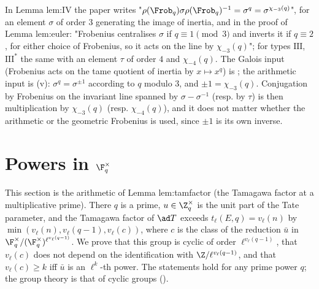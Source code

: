 \begin{paperlink}\label{pl:rings:euler}
In Lemma lem:IV the paper writes "$\rho(\Frob_q)\sigma\rho(\Frob_q)^{-1}=\sigma^q=\sigma^{\chi_{-3}(q)}$", for an element $\sigma$ of order $3$ generating the
image of inertia, and in the proof of Lemma lem:euler: "Frobenius centralises $\sigma$ if $q\equiv1\pmod3$ and inverts it if $q\equiv2$, for either
choice of Frobenius, so it acts on the line by $\chi_{-3}(q)$"; for types $\mathrm{III}$, $\mathrm{III}^*$ the same with an element $\tau$ of order $4$ and
$\chi_{-4}(q)$. The Galois input (Frobenius acts on the tame quotient of inertia by $x\mapsto x^q$) is ; the arithmetic
input is (v): $\sigma^q=\sigma^{\pm1}$ according to $q$ modulo $3$, and $\pm1=\chi_{-3}(q)$. Conjugation by Frobenius on the
invariant line spanned by $\sigma-\sigma^{-1}$ (resp. by $\tau$) is then multiplication by $\chi_{-3}(q)$ (resp. $\chi_{-4}(q)$), and it does not matter
whether the arithmetic or the geometric Frobenius is used, since $\pm1$ is its own inverse.
\end{paperlink}

\section{Powers in \texorpdfstring{$\F_q^\times$}{Fq*}}\label{sec:rings:powers}

This section is the arithmetic of Lemma lem:tamfactor (the Tamagawa factor at a multiplicative prime). There $q$ is a
prime, $u\in\Z_q^\times$ is the unit part of the Tate parameter, and the Tamagawa factor of $\ad T$ exceeds $t_\ell(E,q)=v_\ell(n)$ by
$\min(v_\ell(n),v_\ell(q-1),v_\ell(c))$, where $c$ is the class of the reduction $\bar u$ in $\F_q^\times/(\F_q^\times)^{\ell^{v_\ell(q-1)}}$. We prove that this group is
cyclic of order $\ell^{v_\ell(q-1)}$, that $v_\ell(c)$ does not depend on the identification with $\Z/\ell^{v_\ell(q-1)}$, and that $v_\ell(c)\ge k$ iff $\bar u$
is an $\ell^k$-th power. The statements hold for any prime power $q$; the group theory is that of cyclic groups ().

